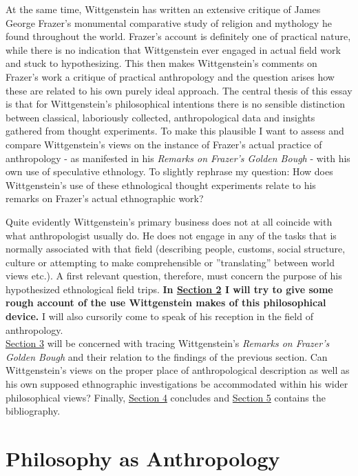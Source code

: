 \documentclass{article}
\begin{document}
At the same time, Wittgenstein has written an extensive critique of James George Frazer's monumental comparative study of religion and mythology he found throughout the world. Frazer's account is definitely one of practical nature, while there is no indication that Wittgenstein ever engaged in actual field work and stuck to hypothesizing. This then makes Wittgenstein's comments on Frazer's work a critique of practical anthropology and the question arises how these are related to his own purely ideal approach. The central thesis of this essay is that for Wittgenstein's philosophical intentions there is no sensible distinction between classical, laboriously collected, anthropological data and insights gathered from thought experiments. To make this plausible I want to assess and compare Wittgenstein's views on the instance of Frazer's actual practice of anthropology - as manifested in his \textit{Remarks on Frazer's Golden Bough} - with his own use of speculative ethnology. To slightly rephrase my question: How does Wittgenstein’s use of these ethnological thought experiments relate to his remarks on Frazer’s actual ethnographic work?

Quite evidently Wittgenstein's primary business does not at all coincide with what anthropologist usually do. He does not engage in any of the tasks that is normally associated with that field (describing people, customs, social structure, culture or attempting to make comprehensible or ''translating'' between world views etc.). A first relevant question, therefore, must concern the purpose of his hypothesized ethnological field trips. \textbf{In \hyperlink{sec2}{Section 2} I will try to give some rough account of the use Wittgenstein makes of this philosophical device.} %
 I will also cursorily come to speak of his reception in the field of anthropology. \\
\hyperlink{sec3}{Section 3} will be concerned with tracing Wittgenstein's \textit{Remarks on Frazer's Golden Bough} and their relation to the findings of the previous section. Can Wittgenstein’s views on the proper place of anthropological description as well as his own supposed ethnographic investigations be accommodated within his wider philosophical views? Finally, \hyperlink{sec4}{Section 4} concludes and \hyperlink{sec4}{Section 5} contains the bibliography.

\section{Philosophy as Anthropology} %
\end{document}
